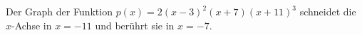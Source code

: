 
Der Graph der Funktion $p(x)=2(x-3)^2(x+7)(x+11)^3$ schneidet die $x$-Achse in $x=-11$ und berührt sie in $x=-7$.
